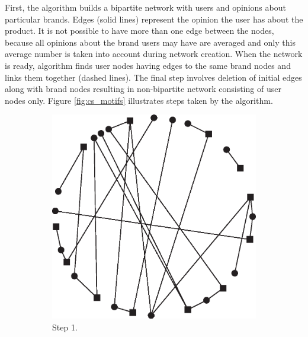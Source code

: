       First, the algorithm builds a bipartite network with users and opinions about particular brands. Edges (solid lines) represent the opinion the user has about the product. It is not possible to have more than one edge between the nodes, because all opinions about the brand users may have are averaged and only this average number is taken into account during network creation. When the network is ready, algorithm finds user nodes having edges to the same brand nodes and links them together (dashed lines). The final step involves deletion of initial edges along with brand nodes resulting in non-bipartite network consisting of user nodes only. Figure \ref{fig:cs_motifs} illustrates steps taken by the algorithm.
      \begin{figure}[h]
        \centering
        \begin{subfigure}[b]{0.3\textwidth}
          \includegraphics[width=\textwidth]{chapters/03_implementation/cs_motif_1}
          \caption{Step 1.}
        \end{subfigure}
        \quad
        \begin{subfigure}[b]{0.3\textwidth}

\end{subfigure}
\end{figure}

